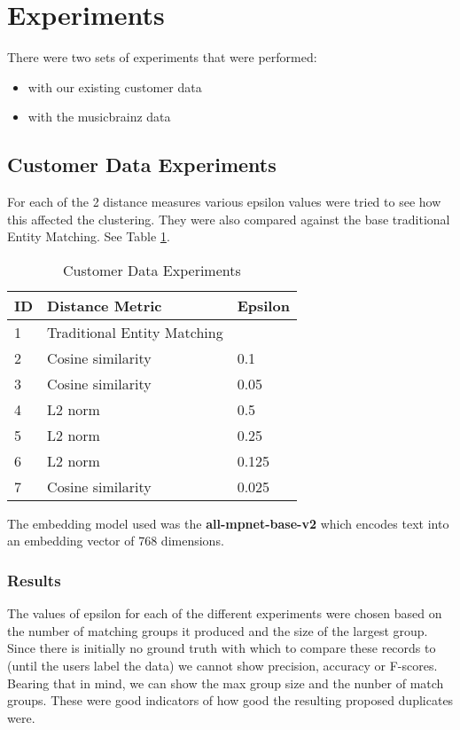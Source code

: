 \documentclass{article}
\begin{document}
\section{Experiments}
\label{sec:experiments}
There were two sets of experiments that were performed:
\begin{itemize}
\item with our existing customer data
\item with the musicbrainz data
\end{itemize}

\subsection{Customer Data Experiments}
For each of the 2 distance measures various epsilon values were tried to see how this affected the clustering. They were also compared against the base traditional Entity Matching. See Table \ref{tab:experiments}.

\begin{table}[h]
 \caption{Customer Data Experiments}
  \centering
  \begin{tabular}{lll}
    \toprule
    ID & Distance Metric             & Epsilon \\
    \midrule
    1  & Traditional Entity Matching &         \\
    2  & Cosine similarity           & 0.1     \\
    3  & Cosine similarity           & 0.05    \\
    4  & L2 norm                     & 0.5     \\
    5  & L2 norm                     & 0.25    \\
    6  & L2 norm                     & 0.125   \\
    7  & Cosine similarity           & 0.025   \\
    \bottomrule
  \end{tabular}
  \label{tab:experiments}
\end{table}

The embedding model used was the \textbf{all-mpnet-base-v2}\cite{allmpnetbasev2} which encodes text into an embedding vector of 768 dimensions.

\subsubsection{Results}
\label{sec:results}
The values of epsilon for each of the different experiments were chosen based on the number of matching groups it produced and the size of the largest group. Since there is initially no ground truth with which to compare these records to (until the users label the data) we cannot show precision, accuracy or F-scores. Bearing that in mind, we can show the max group size and the nunber of match groups. These were good indicators of how good the resulting proposed duplicates were.
\end{document}
